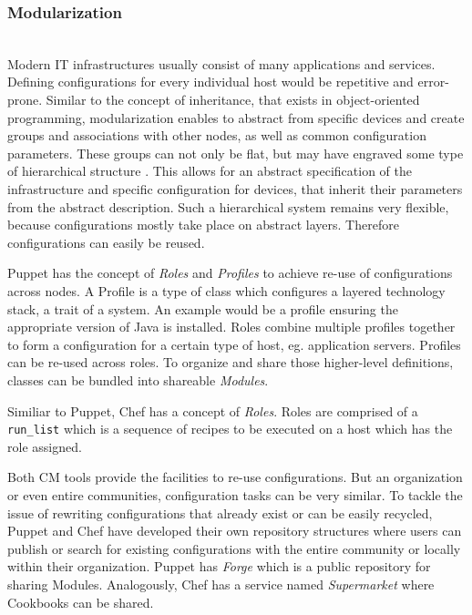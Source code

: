 \subsubsection{Modularization}\hfill\\

Modern IT infrastructures usually consist of many applications and services. Defining configurations for every individual host would be repetitive and error-prone. Similar to the concept of inheritance, that exists in object-oriented programming, modularization enables to abstract from specific devices and create groups and associations with other nodes, as well as common configuration parameters. These groups can not only be flat, but may have engraved some type of hierarchical structure \cite{delaet2010survey}. This allows for an abstract specification of the infrastructure and specific configuration for devices, that inherit their parameters from the abstract description. Such a hierarchical system remains very flexible, because configurations mostly take place on abstract layers. Therefore configurations can easily be reused.

Puppet has the concept of \textit{Roles} and \textit{Profiles} to achieve re-use of configurations across nodes. A Profile is a type of class which configures a layered technology stack, a trait of a system. An example would be a profile ensuring the appropriate version of Java is installed. Roles combine multiple profiles together to form a configuration for a certain type of host, eg. application servers. Profiles can be re-used across roles. To organize and share those higher-level definitions, classes can be bundled into shareable \textit{Modules}.

Similiar to Puppet, Chef has a concept of \textit{Roles}. Roles are comprised of a \texttt{run\_list} which is a sequence of recipes to be executed on a host which has the role assigned.

Both CM tools provide the facilities to re-use configurations. But an organization or even entire communities, configuration tasks can be very similar. To tackle the issue of rewriting configurations that already exist or can be easily recycled, Puppet and Chef have developed their own repository structures where users can publish or search for existing configurations with the entire community or locally within their organization. Puppet has \textit{Forge} which is a public repository for sharing Modules. Analogously, Chef has a service named \textit{Supermarket} where Cookbooks can be shared.

